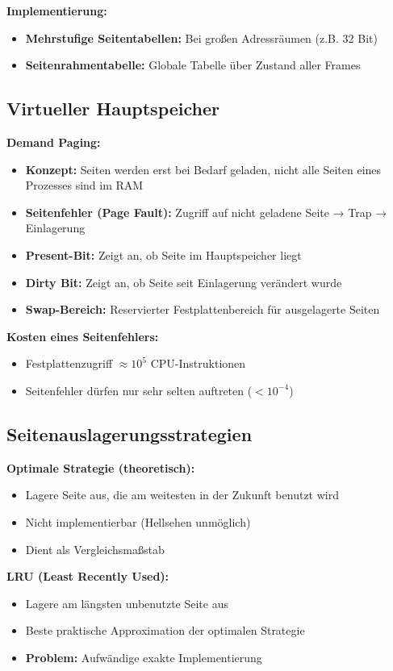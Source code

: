 \documentclass[9pt,a4paper]{extarticle}
\begin{document}
\begin{multicols*}{2}
\textbf{Implementierung:}
\begin{itemize}
\item \textbf{Mehrstufige Seitentabellen:} Bei großen Adressräumen (z.B. 32 Bit)
\item \textbf{Seitenrahmentabelle:} Globale Tabelle über Zustand aller Frames
\end{itemize}

\subsection{Virtueller Hauptspeicher}
\textbf{Demand Paging:}
\begin{itemize}
\item \textbf{Konzept:} Seiten werden erst bei Bedarf geladen, nicht alle Seiten eines Prozesses sind im RAM
\item \textbf{Seitenfehler (Page Fault):} Zugriff auf nicht geladene Seite → Trap → Einlagerung
\item \textbf{Present-Bit:} Zeigt an, ob Seite im Hauptspeicher liegt
\item \textbf{Dirty Bit:} Zeigt an, ob Seite seit Einlagerung verändert wurde
\item \textbf{Swap-Bereich:} Reservierter Festplattenbereich für ausgelagerte Seiten
\end{itemize}

\textbf{Kosten eines Seitenfehlers:}
\begin{itemize}
\item Festplattenzugriff $\approx 10^5$ CPU-Instruktionen
\item Seitenfehler dürfen nur sehr selten auftreten ($< 10^{-4}$)
\end{itemize}

\subsection{Seitenauslagerungsstrategien}
\textbf{Optimale Strategie (theoretisch):}
\begin{itemize}
\item Lagere Seite aus, die am weitesten in der Zukunft benutzt wird
\item Nicht implementierbar (Hellsehen unmöglich)
\item Dient als Vergleichsmaßstab
\end{itemize}

\textbf{LRU (Least Recently Used):}
\begin{itemize}
\item Lagere am längsten unbenutzte Seite aus
\item Beste praktische Approximation der optimalen Strategie
\item \textbf{Problem:} Aufwändige exakte Implementierung
\end{itemize}


\end{multicols*}
\end{document}

